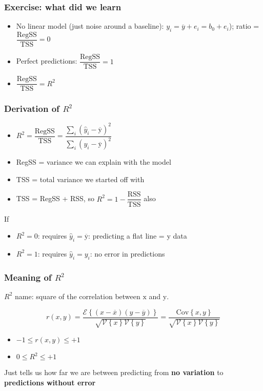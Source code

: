 \begin{frame}\frametitle{Exercise: what did we learn}
	\begin{itemize}
		\item	No linear model (just noise around a baseline): $y_i = \overline{y} + e_i = b_0 + e_i$); ratio = $\dfrac{\text{RegSS}}{\text{TSS}} = 0$
		\item	Perfect predictions: $\dfrac{\text{RegSS}}{\text{TSS}} = 1$
		\item	$\dfrac{\text{RegSS}}{\text{TSS}} = R^2$
	\end{itemize}
\end{frame}

\begin{frame}\frametitle{Derivation of $R^2$}
	\begin{itemize}
		\item	$R^2 = \dfrac{\text{RegSS}}{\text{TSS}} = \dfrac{\sum_i{ \left(\hat{y}_i - \overline{\mathrm{y}}\right)^2}}{\sum_i{ \left(y_i - \overline{\mathrm{y}}\right)^2}}$
		\item	RegSS = variance we can explain with the model
		\item	TSS = total variance we started off with
		\item	TSS = RegSS + RSS, so $R^2 = 1-\dfrac{\text{RSS}}{\text{TSS}}$ also
	\end{itemize}

	If
	\begin{itemize}
		\item	$R^2 = 0$: requires $\hat{y}_i = \overline{\mathrm{y}}$: predicting a flat line = $\mathrm{y}$ data
		\item	$R^2 = 1$: requires $\hat{y}_i = y_i$: no error in predictions
	\end{itemize}
\end{frame}

\begin{frame}\frametitle{Meaning of $R^2$}

	$R^2$ name: square of the correlation between $\mathrm{x}$ and $\mathrm{y}$.

	$$ r(x, y) = \dfrac{\mathcal{E}\left\{ (x - \overline{x}) (y - \overline{y})\right\}}{\sqrt{\mathcal{V}\left\{x\right\}\mathcal{V}\left\{y\right\}}} = \dfrac{\text{Cov}\left\{x, y\right\}}{\sqrt{\mathcal{V}\left\{x\right\}\mathcal{V}\left\{y\right\}}} $$
	\begin{itemize}
		\item	$-1 \leq r(x,y) \leq +1$
		\item	$0 \leq R^2 \leq +1 $
	\end{itemize}

	Just tells us how far we are between predicting from \textbf{no variation} to \textbf{predictions without error}
\end{frame}

